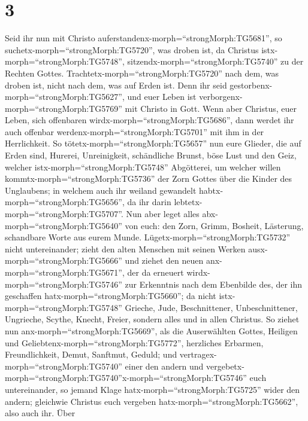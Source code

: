 \hypertarget{section-2}{%
\section{3}\label{section-2}}

 Seid ihr nun mit Christo
auferstandenx-morph=``strongMorph:TG5681'', so
suchetx-morph=``strongMorph:TG5720'', was droben ist, da Christus
istx-morph=``strongMorph:TG5748'', sitzendx-morph=``strongMorph:TG5740''
zu der Rechten Gottes. 
Trachtetx-morph=``strongMorph:TG5720'' nach dem, was droben ist, nicht
nach dem, was auf Erden ist.  Denn ihr seid
gestorbenx-morph=``strongMorph:TG5627'', und euer Leben ist
verborgenx-morph=``strongMorph:TG5769'' mit Christo in Gott.
 Wenn aber Christus, euer Leben, sich offenbaren
wirdx-morph=``strongMorph:TG5686'', dann werdet ihr auch offenbar
werdenx-morph=``strongMorph:TG5701'' mit ihm in der Herrlichkeit.
 So tötetx-morph=``strongMorph:TG5657'' nun eure Glieder,
die auf Erden sind, Hurerei, Unreinigkeit, schändliche Brunst, böse Lust
und den Geiz, welcher istx-morph=``strongMorph:TG5748'' Abgötterei,
 um welcher willen kommtx-morph=``strongMorph:TG5736'' der
Zorn Gottes über die Kinder des Unglaubens;  in welchem auch
ihr weiland gewandelt habtx-morph=``strongMorph:TG5656'', da ihr darin
lebtetx-morph=``strongMorph:TG5707''.  Nun aber leget alles
abx-morph=``strongMorph:TG5640'' von euch: den Zorn, Grimm, Bosheit,
Lästerung, schandbare Worte aus eurem Munde. 
Lügetx-morph=``strongMorph:TG5732'' nicht untereinander; zieht den alten
Menschen mit seinen Werken ausx-morph=``strongMorph:TG5666''
 und ziehet den neuen anx-morph=``strongMorph:TG5671'', der
da erneuert wirdx-morph=``strongMorph:TG5746'' zur Erkenntnis nach dem
Ebenbilde des, der ihn geschaffen hatx-morph=``strongMorph:TG5660'';
 da nicht istx-morph=``strongMorph:TG5748'' Grieche, Jude,
Beschnittener, Unbeschnittener, Ungrieche, Scythe, Knecht, Freier,
sondern alles und in allen Christus.  So ziehet nun
anx-morph=``strongMorph:TG5669'', als die Auserwählten Gottes, Heiligen
und Geliebtenx-morph=``strongMorph:TG5772'', herzliches Erbarmen,
Freundlichkeit, Demut, Sanftmut, Geduld;  und
vertragex-morph=``strongMorph:TG5740'' einer den andern und
vergebetx-morph=``strongMorph:TG5740''\textbar x-morph=``strongMorph:TG5746''
euch untereinander, so jemand Klage hatx-morph=``strongMorph:TG5725''
wider den andern; gleichwie Christus euch vergeben
hatx-morph=``strongMorph:TG5662'', also auch ihr.  Über

